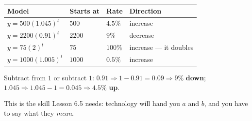 \documentclass[aspectratio=169, 11pt]{beamer}
\begin{document}
\begin{frame}[t, plain]
  \begin{center}
  \renewcommand{\arraystretch}{1.4}
  \begin{tabular}{llll}
  \hline
  \textbf{Model} & \textbf{Starts at} & \textbf{Rate} & \textbf{Direction} \\
  \hline
  $y=500(1.045)^{t}$ & $500$ & $4.5\%$ & increase \\
  $y=2200(0.91)^{t}$ & $2200$ & $9\%$ & decrease \\
  $y=75(2)^{t}$ & $75$ & $100\%$ & increase --- it doubles \\
  $y=1000(1.005)^{t}$ & $1000$ & $0.5\%$ & increase \\
  \hline
  \end{tabular}
  \end{center}
  \vspace{8pt}
  \begin{center}
    Subtract from $1$ or subtract $1$: \; $0.91 \Rightarrow 1-0.91 = 0.09 \Rightarrow 9\%$
    \textbf{down}; \quad $1.045 \Rightarrow 1.045-1 = 0.045 \Rightarrow 4.5\%$ \textbf{up}.
  \end{center}
  \vspace{4pt}
  \begin{center}
    {\footnotesize This is the skill Lesson 6.5 needs: technology will hand you $a$ and $b$, and you
    have to say what they \emph{mean}.}
  \end{center}
\end{frame}
\end{document}
